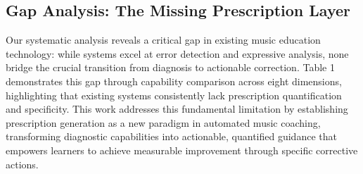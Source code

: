 \subsection{Gap Analysis: The Missing Prescription Layer}
Our systematic analysis reveals a critical gap in existing music education technology: while systems excel at error detection and expressive analysis, none bridge the crucial transition from diagnosis to actionable correction.
Table 1 demonstrates this gap through capability comparison across eight dimensions, highlighting that existing systems consistently lack prescription quantification and specificity.
This work addresses this fundamental limitation by establishing prescription generation as a new paradigm in automated music coaching, transforming diagnostic capabilities into actionable, quantified guidance that empowers learners to achieve measurable improvement through specific corrective actions.